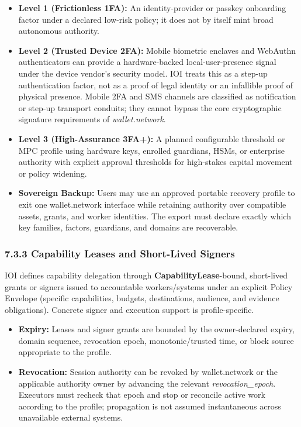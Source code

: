 \documentclass[
  11pt,
]{article}
\providecommand{\tightlist}{%
  \setlength{\itemsep}{0pt}\setlength{\parskip}{0pt}}
\begin{document}
\begin{itemize}
\tightlist
\item
  \textbf{Level 1 (Frictionless 1FA):} An identity-provider or passkey
  onboarding factor under a declared low-risk policy; it does not by itself
  mint broad autonomous authority.
\item
  \textbf{Level 2 (Trusted Device 2FA):} Mobile biometric enclaves and
  WebAuthn authenticators can provide a hardware-backed
  local-user-presence signal under the device vendor's security model.
  IOI treats this as a step-up authentication factor, not as a proof of
  legal identity or an infallible proof of physical presence. Mobile 2FA
  and SMS channels are classified as notification or step-up transport
  conduits; they cannot bypass the core cryptographic signature
  requirements of \emph{wallet.network}.
\item
  \textbf{Level 3 (High-Assurance 3FA+):} A planned configurable threshold
  or MPC profile using hardware keys, enrolled guardians, HSMs, or enterprise
  authority with explicit approval thresholds for high-stakes capital
  movement or policy widening.
\item
  \textbf{Sovereign Backup:} Users may use an approved portable recovery
  profile to exit one wallet.network interface while retaining authority
  over compatible assets, grants, and worker identities. The export must
  declare exactly which key families, factors, guardians, and domains are
  recoverable.
\end{itemize}

\hypertarget{session-keys-the-burner-wallet-pattern}{%
\subsubsection{7.3.3 Capability Leases and Short-Lived Signers
}\label{session-keys-the-burner-wallet-pattern}}

IOI defines capability delegation through \textbf{CapabilityLease}-bound,
short-lived grants or signers issued to accountable workers/systems under an
explicit Policy Envelope (specific capabilities, budgets, destinations,
audience, and evidence obligations). Concrete signer and execution support is
profile-specific.

\begin{itemize}
\tightlist
\item
  \textbf{Expiry:} Leases and signer grants are bounded by the owner-declared
  expiry, domain sequence, revocation epoch, monotonic/trusted time, or block
  source appropriate to the profile.
\item
  \textbf{Revocation:} Session authority can be revoked by
  wallet.network or the applicable authority owner by advancing the relevant
  \emph{revocation\_epoch}. Executors must recheck that epoch and stop or
  reconcile active work according to the profile; propagation is not assumed
  instantaneous across unavailable external systems.
\end{itemize}
\end{document}

